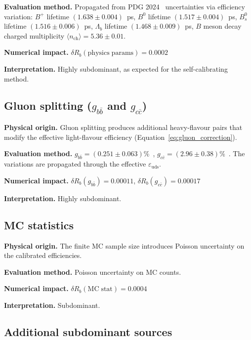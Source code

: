 \documentclass[11pt,a4paper]{article}
\begin{document}
\textbf{Evaluation method.} Propagated from PDG 2024~\cite{PDG:2024} uncertainties
via efficiency variation:
$B^+$ lifetime $(1.638 \pm 0.004)$~ps,
$B^0$ lifetime $(1.517 \pm 0.004)$~ps,
$B_s^0$ lifetime $(1.516 \pm 0.006)$~ps,
$\Lambda_b$ lifetime $(1.468 \pm 0.009)$~ps,
$B$ meson decay charged multiplicity $\langle n_\mathrm{ch} \rangle = 5.36 \pm 0.01$.

\textbf{Numerical impact.}
$\delta R_b(\mathrm{physics\;params}) = 0.0002$

\textbf{Interpretation.} Highly subdominant, as expected for the self-calibrating method.

\subsection{Gluon splitting ($g_{b\bar{b}}$ and $g_{c\bar{c}}$)}
\label{sec:syst_gluon}

\textbf{Physical origin.} Gluon splitting produces additional heavy-flavour pairs
that modify the effective light-flavour efficiency (Equation~\ref{eq:gluon_correction}).

\textbf{Evaluation method.}
$g_{b\bar{b}} = (0.251 \pm 0.063)\%$~\cite{LEP:HF:2001},
$g_{c\bar{c}} = (2.96 \pm 0.38)\%$~\cite{LEP:gcc}.
The variations are propagated through the effective $\varepsilon_\mathrm{uds}$.

\textbf{Numerical impact.}
$\delta R_b(g_{b\bar{b}}) = 0.00011$,
$\delta R_b(g_{c\bar{c}}) = 0.00017$

\textbf{Interpretation.} Highly subdominant.

\subsection{MC statistics}
\label{sec:syst_mc_stat}

\textbf{Physical origin.} The finite MC sample size introduces Poisson uncertainty on
the calibrated efficiencies.

\textbf{Evaluation method.} Poisson uncertainty on MC counts.

\textbf{Numerical impact.}
$\delta R_b(\mathrm{MC\;stat}) = 0.0004$

\textbf{Interpretation.} Subdominant.

\subsection{Additional subdominant sources}
\label{sec:syst_minor}
\end{document}
